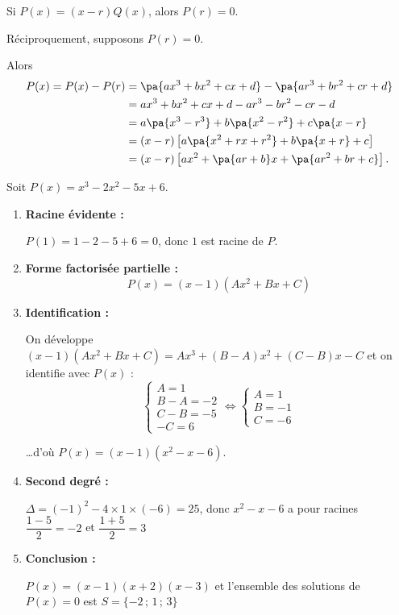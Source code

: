 \begin{demo}
	Si $P(x) = (x - r)Q(x)$, alors $P(r) = 0$.

	Réciproquement, supposons $P(r) = 0$.

	Alors
	\begin{align*}
		P(x) = P(x) - P(r) & = \pa{ax^3 + bx^2 + cx + d} - \pa{ar^3 + br^2 + cr + d}         \\
		                   & = ax^3 + bx^2 + cx + d - ar^3 - br^2 - cr - d                   \\
		                   & = a\pa{x^3 - r^3} + b\pa{x^2 - r^2} + c\pa{x - r}               \\
		                   & = (x - r)\left[a\pa{x^2 + rx + r^2} + b\pa{x + r} + c\right]    \\
		                   & = (x - r)\left[ax^2 + \pa{ar + b}x + \pa{ar^2 + br + c}\right].
	\end{align*}
\end{demo}

\begin{methode}
	Soit $P(x) = x^3 - 2x^2 - 5x + 6$.
	\begin{enumerate}
		\item \textbf{Racine évidente :}

		      $P(1) = 1 - 2 - 5 + 6 = 0$, donc $1$ est racine de $P$.

		\item \textbf{Forme factorisée partielle :}
		      \[
			      P(x) = (x - 1)(Ax^2 + Bx + C)
		      \]

		\item \textbf{Identification :}

		      On développe $(x-1)(Ax^2 + Bx + C) = Ax^3 + (B - A)x^2 + (C - B)x - C$ et on identifie avec $P(x)$ :
		      \[
			      \begin{cases}
				      A = 1      \\
				      B - A = -2 \\
				      C - B = -5 \\
				      -C = 6
			      \end{cases}
			      \iff
			      \begin{cases}
				      A = 1  \\
				      B = -1 \\
				      C = -6
			      \end{cases}
		      \]

		      \ldots d'où $P(x) = (x - 1)(x^2 - x - 6)$.
		\item \textbf{Second degré :}

		      $\Delta = (-1)^2 - 4 \times 1 \times (-6) = 25$, donc $x^2 - x - 6$ a pour racines $\dfrac{1 - 5}{2} = -2$ et $\dfrac{1 + 5}{2} = 3$

		\item \textbf{Conclusion :}

		      $P(x) = (x - 1)(x + 2)(x - 3)$ et l'ensemble des solutions de $P(x) = 0$ est $S = \{-2\,;\,1\,;\,3\}$
	\end{enumerate}
\end{methode}

